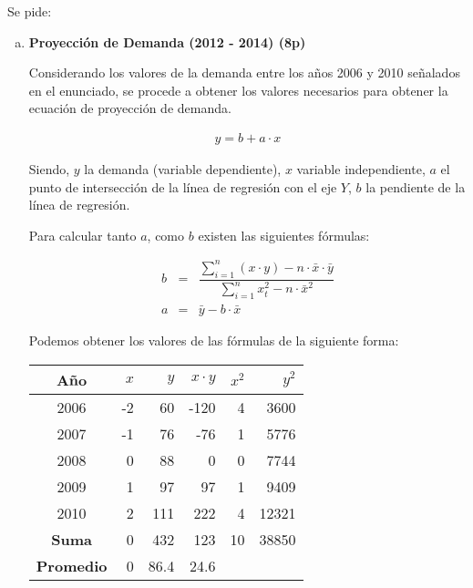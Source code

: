 Se pide:
\newpage
\begin{enumerate}[(a)]

    \item {\bf Proyección de Demanda (2012 - 2014) (8p)}


          Considerando los valores de la demanda entre los años 2006 y 2010 señalados
          en el enunciado, se procede a obtener los valores necesarios para obtener la ecuación
          de proyección de demanda.

          \begin{eqnarray}
              y = b + a\cdot x 
          \end{eqnarray}

          Siendo, $y$ la demanda (variable dependiente), $x$ variable independiente,
          $a$ el punto de intersección de la línea de regresión con el eje $Y$,
          $b$ la pendiente de la línea de regresión.

          Para calcular tanto $a$, como $b$ existen las siguientes fórmulas:

          \begin{eqnarray}
              b &=& \dfrac{\sum_{i=1}^{n} (x\cdot y) - n\cdot \bar{x}\cdot \bar{y}}{\sum_{i=1}^{n} x_{t}^{2} - n\cdot \bar{x}^{2}} \\
              a &=& \bar{y} - b\cdot \bar{x} 
          \end{eqnarray}

          Podemos obtener los valores de las fórmulas de la siguiente forma:

          \begin{table}[h!t]
            \centering
            \begin{tabular}{|c|r|r|r|r|r|}
                \hline
                {\bf Año}      & {\bf $x$} & {\bf $y$} & {\bf $x\cdot y$} & {\bf $x^{2}$} & {\bf $y^{2}$} \\ \hline
                2006           & -2      & 60      & -120           & 4             & 3600          \\
                2007           & -1      & 76      & -76            & 1             & 5776          \\
                2008           & 0       & 88      & 0              & 0             & 7744          \\
                2009           & 1       & 97      & 97             & 1             & 9409          \\
                2010           & 2       & 111     & 222            & 4             & 12321         \\ \hline
                {\bf Suma}     & 0       & 432     & 123            & 10            & 38850         \\ \hline
                {\bf Promedio} & 0       & 86.4    & 24.6           &               &               \\ \hline
            \end{tabular}
          \end{table}            


\end{enumerate}
